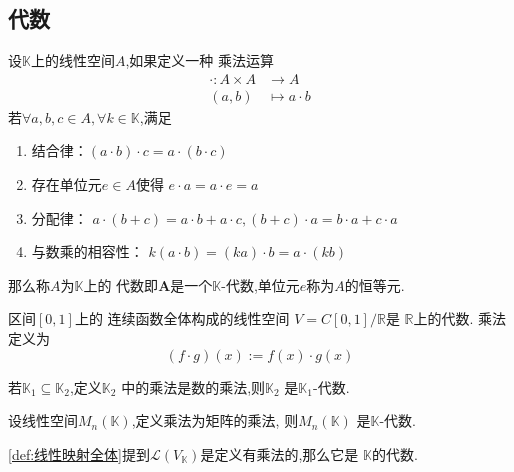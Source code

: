 \subsection{代数}
\begin{formal}
\begin{definition}[代数]\label{def:代数}
    设$\mathbb{K}$上的线性空间$A$,如果定义一种
    乘法运算
    \begin{align*}
        \cdot : 
        A \times A & \longrightarrow A\\
        \left(a,b\right)&\longmapsto a\cdot b
    \end{align*}
    若$\forall a,b,c 
    \in A,\forall k \in \mathbb{K}$,满足
    \begin{enumerate}[label=\textup{(\arabic*)}]
      \item 结合律：$
      \left(a \cdot b\right) \cdot c = 
      a \cdot \left(b \cdot c\right)$
      \item 存在单位元$e \in A $使得
      $e \cdot a = a \cdot e = a$
      \item 分配律：
      $a\cdot\left(b+c\right)
      = a\cdot b +a\cdot c,
      \left(b + c\right)\cdot a 
      =b \cdot a + c \cdot a$
      \item 与数乘的相容性：
      $k\left(a\cdot b\right)=
      \left(ka\right)\cdot b=
      a\cdot\left(kb\right)
      $
    \end{enumerate}
    那么称$A$为$\mathbb{K}$上的
    代数即$\bm{A}$是一个$\mathbb{K}$-代数,单位元$e$称为$A$的恒等元.
\end{definition}
\end{formal}
\begin{brown}
\begin{example}
    区间$\left[0,1\right]$上的
    连续函数全体构成的线性空间
    $V = C\left[0,1\right]/
    \mathbb{R}$是
    $\mathbb{R}$上的代数.
    乘法定义为
    \[
    \left(f\cdot g\right)\left(x
    \right):=
    f\left(x\right)\cdot g\left(x
    \right)
    \]
\end{example}
\end{brown}
\begin{brown}
\begin{example}
    若$\mathbb{K}_1 \subseteq
    \mathbb{K}_2$,定义$\mathbb{K}_2$
    中的乘法是数的乘法,则$\mathbb{K}_2$
    是$\mathbb{K}_1$-代数.
\end{example}
\end{brown}
\begin{brown}
\begin{example}
    设线性空间$M_n\left(
        \mathbb{K}
    \right)$,定义乘法为矩阵的乘法,
    则$M_n\left(\mathbb{K}\right)$
    是$\mathbb{K}$-代数.
\end{example}
\end{brown}
\begin{brown}
\begin{example}
    \cref{def:线性映射全体}提到$\mathcal{L} \left(V
    _{\mathbb{K}}
    \right)$是定义有乘法的,那么它是
    $\mathbb{K}$的代数.
\end{example}
\end{brown}
